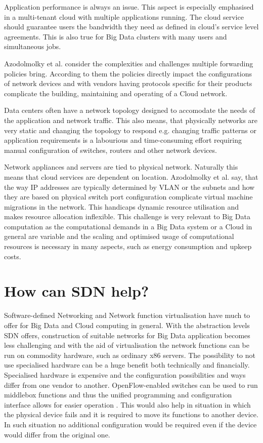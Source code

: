 \documentclass{acm_proc_article-sp}
\begin{document}
Application performance is always an issue. This aspect is especially emphasised in a multi-tenant cloud with multiple applications running. The cloud service should guarantee users the bandwidth they need as defined in cloud's service level agreements. This is also true for Big Data clusters with many users and simultaneous jobs.

Azodolmolky et al. consider the complexities and challenges multiple forwarding policies bring. According to them the policies directly impact the configurations of network devices and with vendors having protocols specific for their products complicate the building, maintaining and operating of a Cloud network.

Data centers often have a network topology designed to accomodate the needs of the application and network traffic. This also means, that physically networks are very static and changing the topology to respond e.g. changing traffic patterns or application requirements is a labourious and time-consuming effort requiring manual configuration of switches, routers and other network devices.

Network appliances and servers are tied to physical network. Naturally this means that cloud services are dependent on location. Azodolmolky et al. say, that the way IP addresses are typically determined by VLAN or the subnets and how they are based on physical switch port configuration complicate virtual machine migrations in the network. This handicaps dynamic resource utilisation and makes resource allocation inflexible. This challenge is very relevant to Big Data computation as the computational demands in a Big Data system or a Cloud in general are variable and the scaling and optimised usage of computational resources is necessary \cite{Frontiers} in many aspects, such as energy consumption and upkeep costs.

\section{How can SDN help?}


Software-defined Networking and Network function virtualisation have much to offer for Big Data and Cloud computing in general. With the abstraction levels SDN offers, construction of suitable networks for Big Data application becomes less challenging and with the aid of virtualisation the network functions can be run on commodity hardware, such as ordinary x86 servers. The possibility to not use specialised hardware can be a huge benefit both technically and financially. Specialised hardware is expensive and the configuration possibilities and ways differ from one vendor to another. OpenFlow-enabled switches can be used to run middlebox functions and thus the unified programming and configuration interface allows for easier operation . This would also help in situation in which the physical device fails and it is required to move its functions to another device. In such situation no additional configuration would be required even if the device would differ from the original one. 
\end{document}
